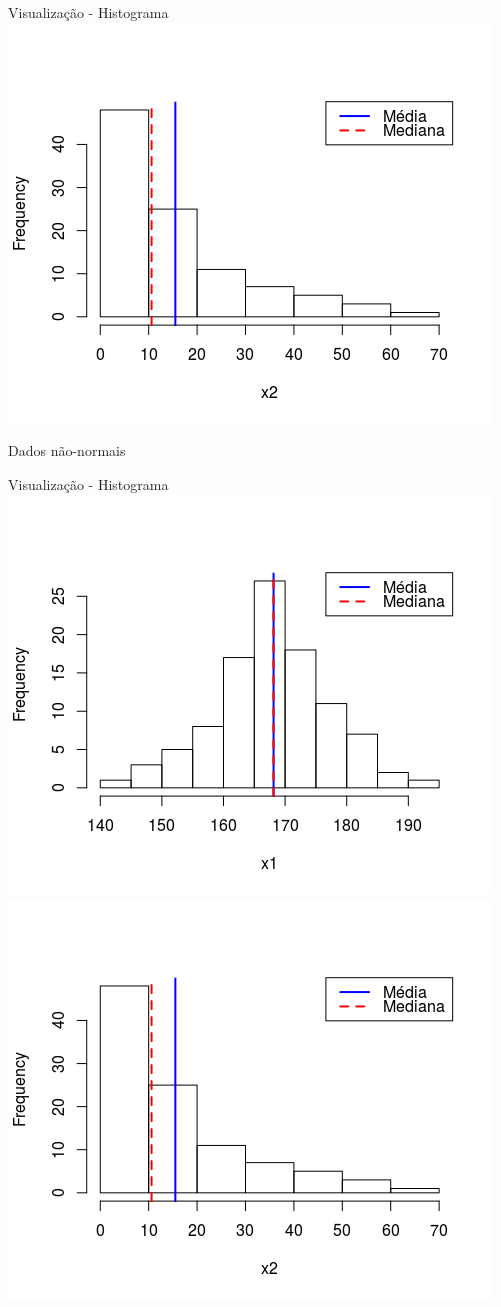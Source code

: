 \documentclass{beamer}
\begin{document}
\begin{frame}{Visualização - Histograma}
  \centering
  \includegraphics[width=.7\textwidth]{Nao_Param/lognormal2-h}

  Dados não-normais
\end{frame}

\begin{frame}{Visualização - Histograma}
  \centering
  \includegraphics[width=.5\textwidth]{Nao_Param/normal2-h}
  \includegraphics[width=.5\textwidth]{Nao_Param/lognormal2-h}
\end{frame}
\end{document}
